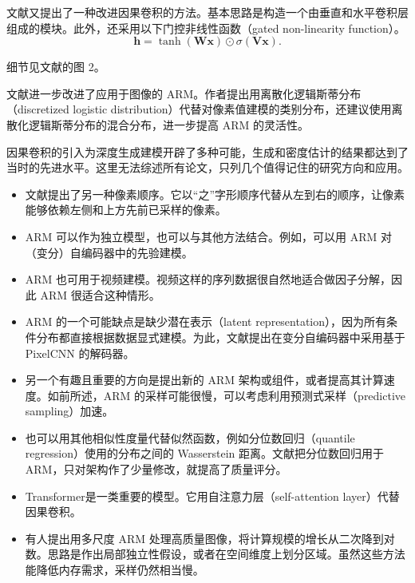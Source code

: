 文献又提出了一种改进因果卷积的方法。基本思路是构造一个由垂直和水平卷积层组成的模块。此外，还采用以下门控非线性函数（gated non-linearity function）。
\begin{equation}
\mathbf{h}=\tanh(\mathbf{W}\mathbf{x})\odot\sigma(\mathbf{V}\mathbf{x}).
\tag{3.15}\label{eq:03-15}
\end{equation}

细节见文献的图 2。

文献进一步改进了应用于图像的 ARM。作者提出用离散化逻辑斯蒂分布（discretized logistic distribution）代替对像素值建模的类别分布，还建议使用离散化逻辑斯蒂分布的混合分布，进一步提高 ARM 的灵活性。

因果卷积的引入为深度生成建模开辟了多种可能，生成和密度估计的结果都达到了当时的先进水平。这里无法综述所有论文，只列几个值得记住的研究方向和应用。
\begin{itemize}
\item 文献提出了另一种像素顺序。它以“之”字形顺序代替从左到右的顺序，让像素能够依赖左侧和上方先前已采样的像素。
\item ARM 可以作为独立模型，也可以与其他方法结合。例如，可以用 ARM 对（变分）自编码器中的先验建模。
\item ARM 也可用于视频建模。视频这样的序列数据很自然地适合做因子分解，因此 ARM 很适合这种情形。
\item ARM 的一个可能缺点是缺少潜在表示（latent representation），因为所有条件分布都直接根据数据显式建模。为此，文献提出在变分自编码器中采用基于 PixelCNN 的解码器。
\item 另一个有趣且重要的方向是提出新的 ARM 架构或组件，或者提高其计算速度。如前所述，ARM 的采样可能很慢，可以考虑利用预测式采样（predictive sampling）加速。
\item 也可以用其他相似性度量代替似然函数，例如分位数回归（quantile regression）使用的分布之间的 Wasserstein 距离。文献把分位数回归用于 ARM，只对架构作了少量修改，就提高了质量评分。
\item Transformer是一类重要的模型。它用自注意力层（self-attention layer）代替因果卷积。
\item 有人提出用多尺度 ARM 处理高质量图像，将计算规模的增长从二次降到对数。思路是作出局部独立性假设，或者在空间维度上划分区域。虽然这些方法能降低内存需求，采样仍然相当慢。
\end{itemize}

